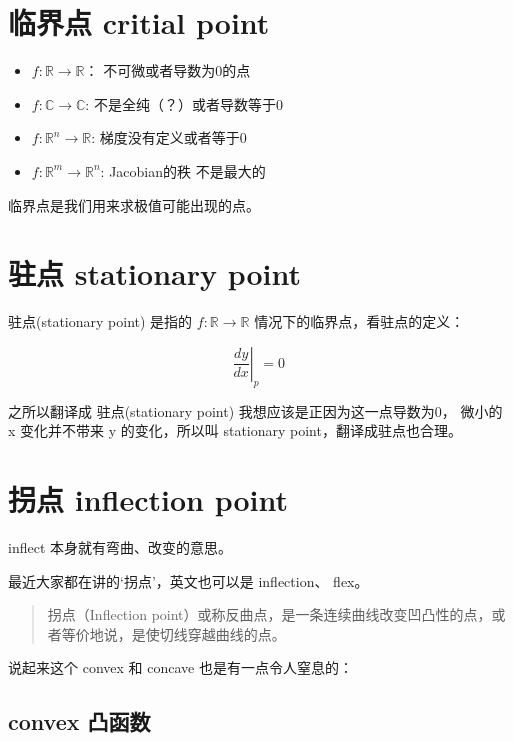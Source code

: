 \documentclass[
]{book}
\providecommand{\tightlist}{%
  \setlength{\itemsep}{0pt}\setlength{\parskip}{0pt}}
\begin{document}
\hypertarget{ux4e34ux754cux70b9-critial-point}{%
\section{临界点 critial point}\label{ux4e34ux754cux70b9-critial-point}}

\begin{itemize}
\tightlist
\item
  \(f: \mathbb{R} \to \mathbb{R}\)： 不可微或者导数为0的点
\item
  \(f: \mathbb {C} \to \mathbb{C}\): 不是全纯（？）或者导数等于0
\item
  \(f: \mathbb {R}^n \to \mathbb{R}\): 梯度没有定义或者等于0
\item
  \(f: \mathbb {R}^m \to \mathbb{R}^n\): Jacobian的秩 不是最大的
\end{itemize}

临界点是我们用来求极值可能出现的点。

\hypertarget{ux9a7bux70b9-stationary-point}{%
\section{驻点 stationary point}\label{ux9a7bux70b9-stationary-point}}

驻点(stationary point) 是指的 \(f: \mathbb{R} \to \mathbb{R}\) 情况下的临界点，看驻点的定义：

\[
 \left.\frac{dy}{dx}\right|_p=0 \,
\]

之所以翻译成 驻点(stationary point) 我想应该是正因为这一点导数为0， 微小的 x 变化并不带来 y 的变化，所以叫 stationary point，翻译成驻点也合理。

\hypertarget{ux62d0ux70b9-inflection-point}{%
\section{拐点 inflection point}\label{ux62d0ux70b9-inflection-point}}

inflect 本身就有弯曲、改变的意思。

最近大家都在讲的`拐点'，英文也可以是 inflection、 flex。

\begin{quote}
拐点（Inflection point）或称反曲点，是一条连续曲线改变凹凸性的点，或者等价地说，是使切线穿越曲线的点。
\end{quote}

说起来这个 convex 和 concave 也是有一点令人窒息的：

\hypertarget{convex-ux51f8ux51fdux6570}{%
\subsection{convex 凸函数}\label{convex-ux51f8ux51fdux6570}}
\end{document}
